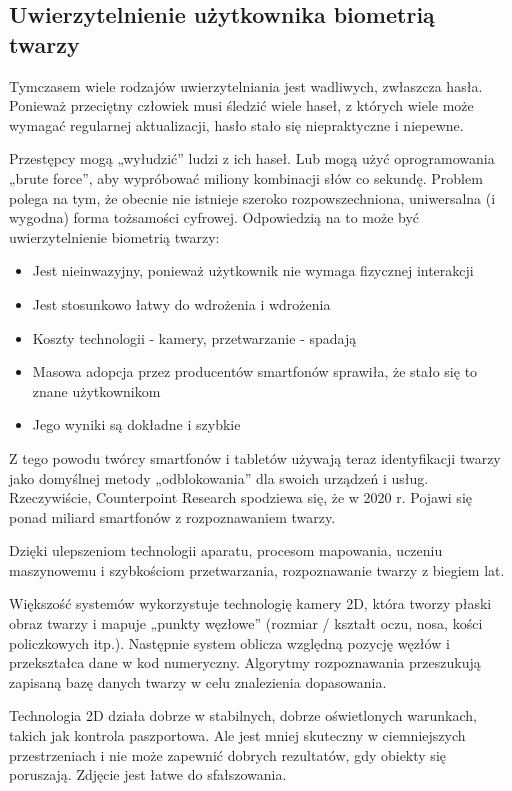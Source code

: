 \subsection{Uwierzytelnienie użytkownika biometrią twarzy}

Tymczasem wiele rodzajów uwierzytelniania jest wadliwych, zwłaszcza hasła. Ponieważ przeciętny człowiek musi śledzić wiele haseł, z których wiele może wymagać regularnej aktualizacji, hasło stało się niepraktyczne i niepewne.

Przestępcy mogą „wyłudzić” ludzi z ich haseł. Lub mogą użyć oprogramowania „brute force”, aby
wypróbować miliony kombinacji słów co sekundę. Problem polega na tym, że obecnie nie istnieje
szeroko rozpowszechniona, uniwersalna (i wygodna) forma tożsamości cyfrowej. Odpowiedzią na to
może być uwierzytelnienie biometrią twarzy:

\begin{itemize}
    \item Jest nieinwazyjny, ponieważ użytkownik nie wymaga fizycznej interakcji
    \item Jest stosunkowo łatwy do wdrożenia i wdrożenia
    \item Koszty technologii - kamery, przetwarzanie - spadają
    \item Masowa adopcja przez producentów smartfonów sprawiła, że stało się to znane użytkownikom
    \item Jego wyniki są dokładne i szybkie
\end{itemize}

Z tego powodu twórcy smartfonów i tabletów używają teraz identyfikacji twarzy jako domyślnej metody „odblokowania” dla swoich urządzeń i usług. Rzeczywiście, Counterpoint Research spodziewa się, że w 2020 r. Pojawi się ponad miliard smartfonów z rozpoznawaniem twarzy.

Dzięki ulepszeniom technologii aparatu, procesom mapowania, uczeniu maszynowemu i szybkościom przetwarzania, rozpoznawanie twarzy z biegiem lat.

Większość systemów wykorzystuje technologię kamery 2D, która tworzy płaski obraz twarzy i mapuje „punkty węzłowe” (rozmiar / kształt oczu, nosa, kości policzkowych itp.). Następnie system oblicza względną pozycję węzłów i przekształca dane w kod numeryczny. Algorytmy rozpoznawania przeszukują zapisaną bazę danych twarzy w celu znalezienia dopasowania.

Technologia 2D działa dobrze w stabilnych, dobrze oświetlonych warunkach, takich jak kontrola paszportowa. Ale jest mniej skuteczny w ciemniejszych przestrzeniach i nie może zapewnić dobrych rezultatów, gdy obiekty się poruszają. Zdjęcie jest łatwe do sfałszowania.

